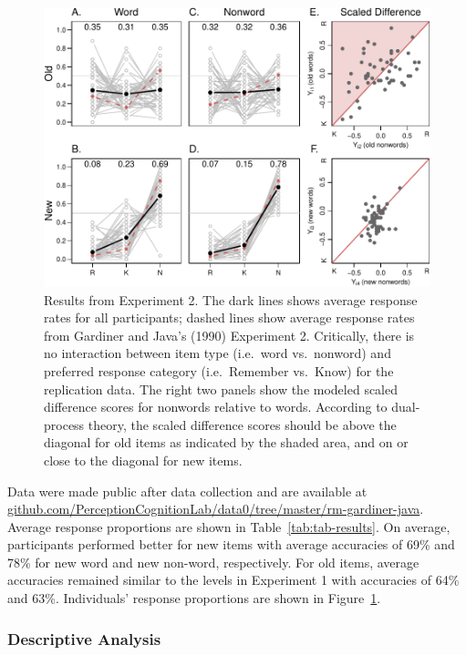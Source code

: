 \documentclass[english,,man,floatsintext]{apa6}
\begin{document}
\begin{figure}
\centering
\includegraphics{p_files/figure-latex/results-2-1.pdf}
\caption{\label{fig:results-2}Results from Experiment 2. The dark lines shows average response rates for all participants; dashed lines show average response rates from Gardiner and Java's (1990) Experiment 2. Critically, there is no interaction between item type (i.e.~word vs.~nonword) and preferred response category (i.e.~Remember vs.~Know) for the replication data. The right two panels show the modeled scaled difference scores for nonwords relative to words. According to dual-process theory, the scaled difference scores should be above the diagonal for old items as indicated by the shaded area, and on or close to the diagonal for new items.}
\end{figure}

Data were made public after data collection and are available at \href{https://github.com/PerceptionCognitionLab/data0/tree/master/rm-gardiner-java}{github.com/PerceptionCognitionLab/data0/tree/master/rm-gardiner-java}.
Average response proportions are shown in Table~\ref{tab:tab-results}. On average, participants performed better for new items with average accuracies of 69\% and 78\% for new word and new non-word, respectively. For old items, average accuracies remained similar to the levels in Experiment 1 with accuracies of 64\% and 63\%. Individuals' response proportions are shown in Figure~\ref{fig:results-2}.

\hypertarget{descriptive-analysis-1}{%
\subsubsection{Descriptive Analysis}\label{descriptive-analysis-1}}
\end{document}
